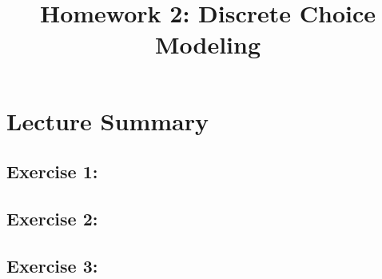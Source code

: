 \documentclass[11pt]{article}
\title{Homework 2: Discrete Choice Modeling}
\begin{document}
\maketitle

\section*{Lecture Summary}


\subsection*{Exercise 1: }


\subsection*{Exercise 2: }


\subsection*{Exercise 3: }
\end{document}
